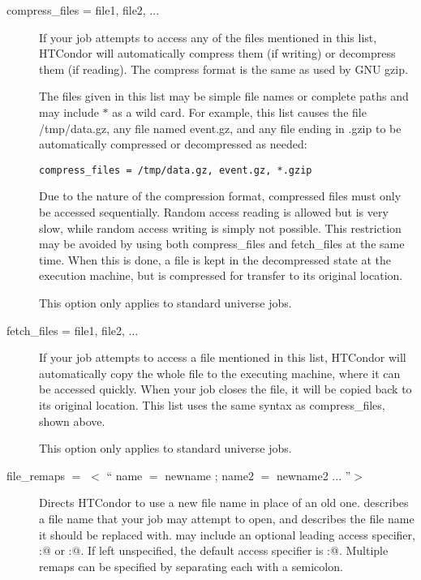 \begin{description}
\label{condor-submit-compress-files}
\item[compress\_files = file1, file2, ...]

If your job attempts to access any of the files mentioned in this list,
HTCondor will automatically compress them (if writing) or decompress them (if reading).
The compress format is the same as used by GNU gzip.

The files given in this list may be simple file names or complete paths and may
include $*$ as a wild card.  For example, this list causes the file /tmp/data.gz,
any file named event.gz, and any file ending in .gzip to be automatically
compressed or decompressed as needed:

\begin{verbatim}
compress_files = /tmp/data.gz, event.gz, *.gzip
\end{verbatim}
Due to the nature of the compression format, compressed files must only
be accessed sequentially.  Random access reading is allowed but is very slow,
while random access writing is simply not possible.  This restriction may be
avoided by using both compress\_files and fetch\_files at the same time.  When
this is done, a file is kept in the decompressed state at the execution
machine, but is compressed for transfer to its original location.

This option only applies to standard universe jobs.


\label{condor-submit-fetch-files}
\item[fetch\_files = file1, file2, ...]
If your job attempts to access a file mentioned in this list,
HTCondor will automatically copy the whole file to the executing machine,
where it can be accessed quickly.  When your job closes the file,
it will be copied back to its original location.
This list uses the same syntax as compress\_files, shown above.

This option only applies to standard universe jobs.


\label{condor-submit-file-remaps}
\item[file\_remaps $=$ $<$ `` name $=$ newname ; name2 $=$ newname2 ... ''$>$ ]

Directs HTCondor to use a new file name in place of an old one.  
describes a file name that your job may attempt to open, and 
describes the file name it should be replaced with.
 may include an optional leading
access specifier, \verb@local:@ or \verb@remote:@.  If left unspecified,
the default access specifier is \verb@remote:@.  Multiple remaps can be
specified by separating each with a semicolon.


\end{description}
